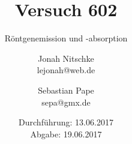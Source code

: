 

\title{Versuch 602}
\subtitle{Röntgenemission und -absorption}
\author{Jonah Nitschke\\
        lejonah@web.de \and
        Sebastian Pape\\
        sepa@gmx.de}
\date{Durchführung: 13.06.2017\\
      Abgabe: 19.06.2017}



\maketitle
\newpage
\setcounter{page}{1}





\printbibliography


